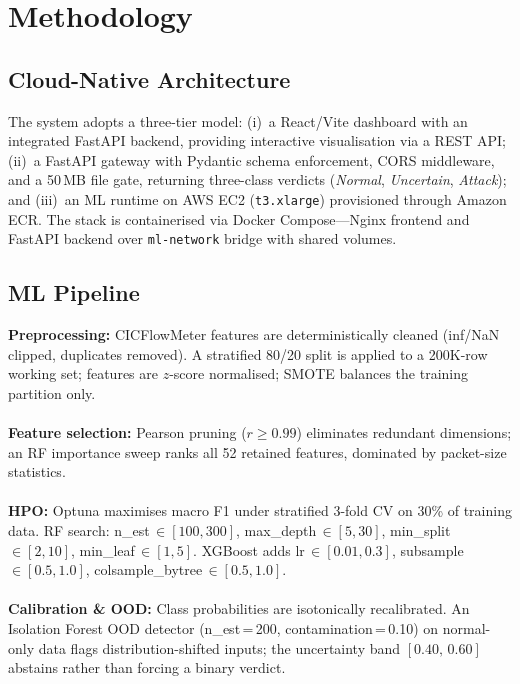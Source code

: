 \documentclass[9pt,conference]{IEEEtran}
\begin{document}
\section{Methodology}

\subsection{Cloud-Native Architecture}
The system adopts a three-tier model: (i)~a React/Vite dashboard with an integrated FastAPI backend, providing interactive visualisation via a REST API; (ii)~a FastAPI gateway with Pydantic schema enforcement, CORS middleware, and a 50\,MB file gate, returning three-class verdicts (\textit{Normal}, \textit{Uncertain}, \textit{Attack}); and (iii)~an ML runtime on AWS EC2 (\texttt{t3.xlarge}) provisioned through Amazon ECR. The stack is containerised via Docker Compose---Nginx frontend and FastAPI backend over \texttt{ml-network} bridge with shared volumes.

\subsection{ML Pipeline}
\textbf{Preprocessing:} CICFlowMeter features are deterministically cleaned (inf/NaN clipped, duplicates removed). A stratified 80/20 split is applied to a 200K-row working set; features are $z$-score normalised; SMOTE balances the training partition only.\\ \\
\hspace*{\parindent}\textbf{Feature selection:} Pearson pruning ($r\!\ge\!0.99$) eliminates redundant dimensions; an RF importance sweep ranks all 52 retained features, dominated by packet-size statistics.\\ \\
\hspace*{\parindent}\textbf{HPO:} Optuna maximises macro F1 under stratified 3-fold CV on 30\% of training data. RF search: n\_est\,$\in[100,300]$, max\_depth\,$\in[5,30]$, min\_split\,$\in[2,10]$, min\_leaf\,$\in[1,5]$. XGBoost adds lr\,$\in[0.01,0.3]$, subsample\,$\in[0.5,1.0]$, colsample\_bytree\,$\in[0.5,1.0]$.\\ \\
\hspace*{\parindent}\textbf{Calibration \& OOD:} Class probabilities are isotonically recalibrated. An Isolation Forest OOD detector (n\_est\,=\,200, contamination\,=\,0.10) on normal-only data flags distribution-shifted inputs; the uncertainty band $[0.40,\,0.60]$ abstains rather than forcing a binary verdict. \\
\end{document}
